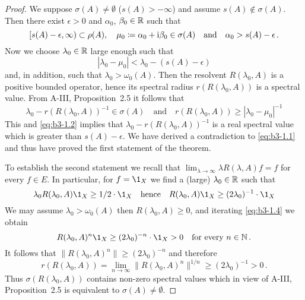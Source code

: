 \begin{proof}
	We suppose $\sigma(A) \neq \emptyset$ (\ie $s(A) > -\infty$) and assume $s(A) \notin \sigma(A)$.
	Then there exist $\epsilon > 0$ and $\alpha_{0}$, $\beta_{0} \in \mathbb{R}$ such that
	\begin{equation}\label{eq:b3-1.1}
		[s(A)-\epsilon,\infty) \subset \rho(A), \quad \mu_{0} \coloneqq \alpha_{0} + \mathrm{i}\beta_{0} \in \sigma(A) \quad \text{and} \quad \alpha_{0} > s(A)-\epsilon\,.
	\end{equation}
	Now we choose $\lambda_{0} \in \mathbb{R}$ large enough such that
	\begin{equation}\label{eq:b3-1.2}
		|\lambda_{0} - \mu_{0}| < \lambda_{0} - (s(A) - \epsilon)
	\end{equation}
	and, in addition, such that $\lambda_{0} > \omega_{0}(A)$.
	Then the resolvent $R(\lambda_{0},A)$ is a positive bounded operator, hence its spectral radius $r(R(\lambda_{0},A))$ is a spectral value.
	From A-III, Proposition~2.5 it follows that
	\begin{equation}\label{eq:b3-1.3}
		\lambda_{0} - r(R(\lambda_{0},A))^{-1} \in \sigma(A) \quad \text{and} \quad r(R(\lambda_{0},A)) \geq |\lambda_{0} - \mu_{0}|^{-1}
	\end{equation}
	This and \eqref{eq:b3-1.2} implies that $\lambda_{0} - r(R(\lambda_{0},A))^{-1}$ is a real spectral value which is greater than $s(A) - \epsilon$.
	We have derived a contradiction to \eqref{eq:b3-1.1} and thus have proved the first statement of the theorem.
	
	To establish the second statement we recall that $\lim_{\lambda \to \infty}\lambda R(\lambda,A)f = f$ for every $f \in E$.
	In particular, for $f = \1_{X}$ we find a (large) $\lambda_{0} \in \mathbb{R}$ such that
	\begin{equation}\label{eq:b3-1.4}
		\lambda_{0}R(\lambda_{0},A)\1_{X} \geq 1/2\cdot\1_{X} \quad \text{hence} \quad R(\lambda_{0},A)\1_{X} \geq (2\lambda_{0})^{-1}\cdot\1_{X}
	\end{equation}
	We may assume $\lambda_{0} > \omega_{0}(A)$ then $R(\lambda_{0},A) \geq 0$, and iterating \eqref{eq:b3-1.4} we obtain
	\begin{equation}\label{eq:b3-1.5}
		R(\lambda_{0},A)^{n}\1_{X} \geq (2\lambda_{0})^{-n}\cdot\1_{X} > 0 \quad \text{for every } n \in \N\,.
	\end{equation}
	It follows that $\|R(\lambda_{0},A)^{n}\| \geq (2\lambda_{0})^{-n}$ and therefore
	\begin{equation}\label{eq:b3-1.6}
		r(R(\lambda_{0},A)) = \lim_{n \to \infty}\|R(\lambda_{0},A)^{n}\|^{1/n} \geq (2\lambda_{0})^{-1} > 0\,.
	\end{equation}
	Thus $\sigma(R(\lambda_{0},A))$ contains non-zero spectral values which in view of A-III, Proposition~2.5 is equivalent to $\sigma(A) \neq \emptyset$.
\end{proof}
